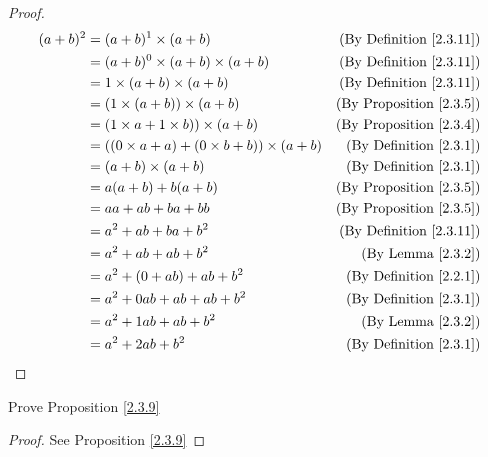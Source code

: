 \begin{proof}
    \begin{align*}
        (a + b)^2 & = (a + b)^1 \times (a + b)                             & \text{(By Definition \ref{2.3.11})} \\
                  & = (a + b)^0 \times (a + b) \times (a + b)              & \text{(By Definition \ref{2.3.11})} \\
                  & = 1 \times (a + b) \times (a + b)                      & \text{(By Definition \ref{2.3.11})} \\
                  & = (1 \times (a + b)) \times (a + b)                    & \text{(By Proposition \ref{2.3.5})} \\
                  & = (1 \times a + 1 \times b)) \times (a + b)            & \text{(By Proposition \ref{2.3.4})} \\
                  & = ((0 \times a + a) + (0 \times b + b)) \times (a + b) & \text{(By Definition \ref{2.3.1})}  \\
                  & = (a + b) \times (a + b)                               & \text{(By Definition \ref{2.3.1})}  \\
                  & = a(a + b) + b(a + b)                                  & \text{(By Proposition \ref{2.3.5})} \\
                  & = aa + ab + ba + bb                                    & \text{(By Proposition \ref{2.3.5})} \\
                  & = a^2 + ab + ba + b^2                                  & \text{(By Definition \ref{2.3.11})} \\
                  & = a^2 + ab + ab + b^2                                  & \text{(By Lemma \ref{2.3.2})}       \\
                  & = a^2 + (0 + ab) + ab + b^2                            & \text{(By Definition \ref{2.2.1})}  \\
                  & = a^2 + 0ab + ab + ab + b^2                            & \text{(By Definition \ref{2.3.1})}  \\
                  & = a^2 + 1ab + ab + b^2                                 & \text{(By Lemma \ref{2.3.2})}       \\
                  & = a^2 + 2ab + b^2                                      & \text{(By Definition \ref{2.3.1})}  \\
    \end{align*}
\end{proof}

\begin{exercise}\label{ex 2.3.5}
    Prove Proposition \ref{2.3.9}
\end{exercise}

\begin{proof}
    See Proposition \ref{2.3.9}
\end{proof}